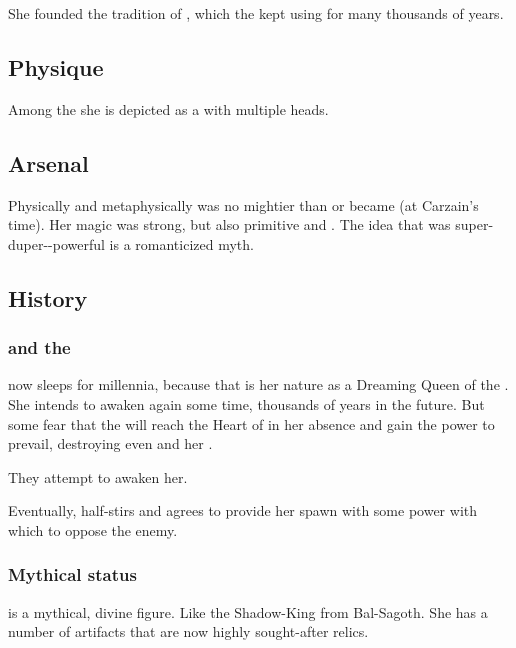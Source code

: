 She founded the tradition of , which the \dragons{} kept using for many thousands of years. 





\subsection{Physique}
Among the \dragons{} she is depicted as a \dragon{} with multiple heads. 





\subsection{Arsenal}
Physically and metaphysically \Kserasshana{} was no mightier than \Secherdamon{} or \Ishnaruchaefir{} became (at Carzain's time). 
Her magic was strong, but also primitive and \naive. 
The idea that \Kserasshana{} was super-duper-\uber-powerful is a romanticized myth. 






\subsection{History}
\subsubsection{\Xserasshana{} and the \firstgendragons}

\Tiamat{} now sleeps for millennia, 
because that is her nature as a Dreaming Queen of the \ophidians{}. She intends to awaken again some time, thousands of years in the future. But some \dragons{} fear that the \banes{} will reach the Heart of \Miith{} in her absence and gain the power to prevail, destroying even \Tiamat{} and her \firstgendragons. 

They attempt to awaken her.

Eventually, \Tiamat{} half-stirs and agrees to provide her spawn with some power with which to oppose the enemy. 





\subsubsection{Mythical status}
\Tiamat{} is a mythical, divine figure. Like the Shadow-King from Bal-Sagoth. She has a number of artifacts that are now highly sought-after relics. 

